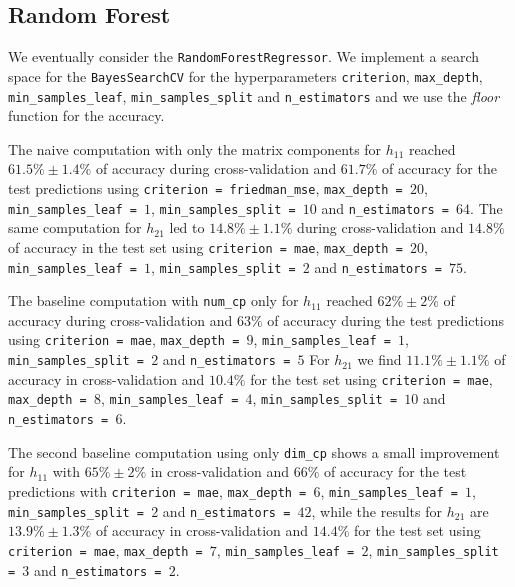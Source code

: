 \subsection{Random Forest}
    We eventually consider the \texttt{RandomForestRegressor}. We implement a search space for the \texttt{BayesSearchCV} for the hyperparameters \texttt{criterion}, \texttt{max\_depth}, \texttt{min\_samples\_leaf}, \texttt{min\_samples\_split} and \texttt{n\_estimators} and we use the \textit{floor} function for the accuracy.
    
    The naive computation with only the matrix components for $h_{11}$ reached $61.5\% \pm 1.4\%$ of accuracy during cross-validation and $61.7\%$ of accuracy for the test predictions using \texttt{criterion = friedman\_mse}, \texttt{max\_depth = $20$}, \texttt{min\_samples\_leaf = $1$}, \texttt{min\_samples\_split = $10$} and \texttt{n\_estimators = $64$}. The same computation for $h_{21}$ led to $14.8\% \pm 1.1\%$ during cross-validation and $14.8\%$ of accuracy in the test set using \texttt{criterion = mae}, \texttt{max\_depth = $20$}, \texttt{min\_samples\_leaf = $1$}, \texttt{min\_samples\_split = $2$} and \texttt{n\_estimators = $75$}.
    
    The baseline computation with \texttt{num\_cp} only for $h_{11}$ reached $62\% \pm 2\%$ of accuracy during cross-validation and $63\%$ of accuracy during the test predictions using \texttt{criterion = mae}, \texttt{max\_depth = $9$}, \texttt{min\_samples\_leaf = $1$}, \texttt{min\_samples\_split = $2$} and \texttt{n\_estimators = $5$} For $h_{21}$ we find $11.1\% \pm 1.1\%$ of accuracy in cross-validation and $10.4\%$ for the test set using \texttt{criterion = mae}, \texttt{max\_depth = $8$}, \texttt{min\_samples\_leaf = $4$}, \texttt{min\_samples\_split = $10$} and \texttt{n\_estimators = $6$}.
    
    The second baseline computation using only \texttt{dim\_cp} shows a small improvement for $h_{11}$ with $65\% \pm 2\%$ in cross-validation and $66\%$ of accuracy for the test predictions with \texttt{criterion = mae}, \texttt{max\_depth = $6$}, \texttt{min\_samples\_leaf = $1$}, \texttt{min\_samples\_split = $2$} and \texttt{n\_estimators = $42$}, while the results for $h_{21}$ are $13.9\% \pm 1.3\%$ of accuracy in cross-validation and $14.4\%$ for the test set using \texttt{criterion = mae}, \texttt{max\_depth = $7$}, \texttt{min\_samples\_leaf = $2$}, \texttt{min\_samples\_split = $3$} and \texttt{n\_estimators = $2$}.
    
